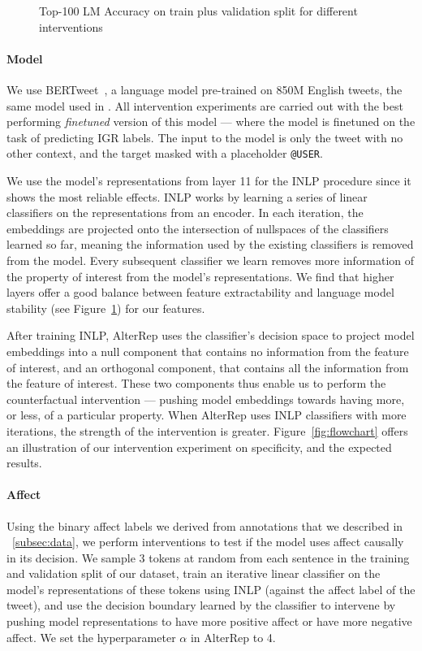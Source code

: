 \begin{figure}[t]
    \centering
    
    \caption{Top-100 LM Accuracy on train plus validation split for different interventions}
    \label{fig:lm-acc}
\end{figure}

\paragraph{Model} We use BERTweet~\citep{nguyen_bertweet_2020}, a language model pre-trained on 850M English tweets, the same model used in \citet{govindarajan-etal-2023-people}. All intervention experiments are carried out with the best performing \emph{finetuned} version of this model --- where the model is finetuned on the task of predicting IGR labels. The input to the model is only the tweet with no other context, and the target masked with a placeholder \texttt{@USER}.

We use the model's representations from layer 11 for the INLP procedure since it shows the most reliable effects. INLP \citep{ravfogel-etal-2020-null} works by learning a series of linear classifiers on the representations from an encoder. In each iteration, the embeddings are projected onto the intersection of nullspaces of the classifiers learned so far, meaning the information used by the existing classifiers is removed from the model. Every subsequent classifier we learn removes more information of the property of interest from the model's representations.  We find that higher layers offer a good balance between feature extractability and language model stability (see Figure~\ref{fig:lm-acc}) for our features. 

After training INLP, AlterRep uses the classifier's decision space to project model embeddings into a null component that contains no information from the feature of interest, and an orthogonal component, that contains all the information from the feature of interest. These two components thus enable us to perform the counterfactual intervention --- pushing model embeddings towards having more, or less, of a particular property. When AlterRep uses INLP classifiers with more iterations, the strength of the intervention is greater. Figure~\ref{fig:flowchart} offers an illustration of our intervention experiment on specificity, and the expected results.

\paragraph{Affect} Using the binary affect labels we derived from annotations that we described in \textsection~\ref{subsec:data}, we perform interventions to test if the model uses affect causally in its decision. We sample 3 tokens at random from each sentence in the training and validation split of our dataset, train an iterative linear classifier on the model's representations of these tokens using INLP (against the affect label of the tweet), and use the decision boundary learned by the classifier to intervene by pushing model representations to have more positive affect or have more negative affect. We set the hyperparameter $\alpha$ in AlterRep to 4.


